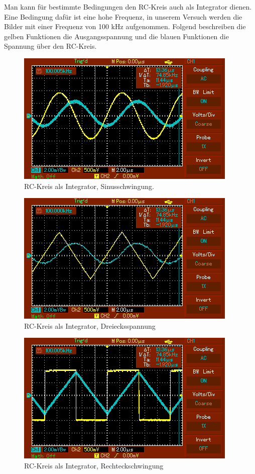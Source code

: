 Man kann für bestimmte Bedingungen den RC-Kreis auch als Integrator dienen. Eine Bedingung dafür
ist eine hohe Frequenz, in unserem Versuch werden die Bilder mit einer Frequenz von 100 kHz
aufgenommen. Folgend beschreiben die gelben Funktionen die Ausgangsspannung und die blauen Funktionen
die Spannung über den RC-Kreis.

\begin{figure}[h!]
  \centering
  \includegraphics[scale = 0.6]{Bild2.png}
  \caption{RC-Kreis als Integrator, Sinusschwingung.}
  \label{Integrator1}
\end{figure}

\begin{figure}[h!]
  \centering
  \includegraphics[scale = 0.6]{Bild4.png}
  \caption{RC-Kreis als Integrator, Dreiecksspannung}
  \label{Integrator2}
\end{figure}

\begin{figure}[h!]
  \centering
  \includegraphics[scale = 0.6]{Bild5.png}
  \caption{RC-Kreis als Integrator, Rechteckschwingung}
  \label{Integrator3}
\end{figure}

